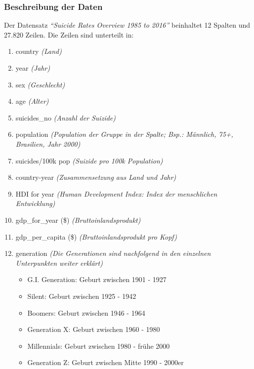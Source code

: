 \documentclass[]{article}
\providecommand{\tightlist}{%
  \setlength{\itemsep}{0pt}\setlength{\parskip}{0pt}}
\begin{document}
\hypertarget{beschreibung-der-daten}{%
\subsubsection{Beschreibung der Daten}\label{beschreibung-der-daten}}

Der Datensatz \emph{``Suicide Rates Overview 1985 to 2016''} beinhaltet
12 Spalten und 27.820 Zeilen. Die Zeilen sind unterteilt in:

\begin{enumerate}
\def\labelenumi{\arabic{enumi}.}
\tightlist
\item
  country \emph{(Land)}
\item
  year \emph{(Jahr)}
\item
  sex \emph{(Geschlecht)}
\item
  age \emph{(Alter)}
\item
  suicides\_no \emph{(Anzahl der Suizide)}
\item
  population \emph{(Population der Gruppe in der Spalte; Bsp.: Männlich,
  75+, Brasilien, Jahr 2000)}
\item
  suicides/100k pop \emph{(Suizide pro 100k Population)}
\item
  country-year \emph{(Zusammensetzung aus Land und Jahr)}
\item
  HDI for year \emph{(Human Development Index: Index der menschlichen
  Entwicklung)}
\item
  gdp\_for\_year (\$) \emph{(Bruttoinlandsprodukt)}
\item
  gdp\_per\_capita (\$) \emph{(Bruttoinlandsprodukt pro Kopf)}
\item
  generation \emph{(Die Generationen sind nachfolgend in den einzelnen
  Unterpunkten weiter erklärt)}

  \begin{itemize}
  \tightlist
  \item
    G.I. Generation: Geburt zwischen 1901 - 1927
  \item
    Silent: Geburt zwischen 1925 - 1942
  \item
    Boomers: Geburt zwischen 1946 - 1964
  \item
    Generation X: Geburt zwischen 1960 - 1980
  \item
    Millennials: Geburt zwischen 1980 - frühe 2000
  \item
    Generation Z: Geburt zwischen Mitte 1990 - 2000er
  \end{itemize}
\end{enumerate}
\end{document}
